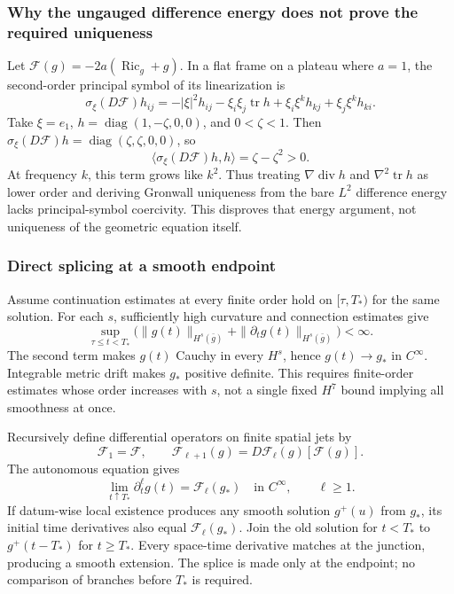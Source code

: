 \documentclass[a4paper,11pt]{article}
\numberwithin{equation}{section}
\theoremstyle{definition}
\newcommand{\Ric}{\operatorname{Ric}}
\newcommand{\tr}{\operatorname{tr}}
\begin{document}
\subsubsection{Why the ungauged difference energy does not prove the required uniqueness}\label{sec:ungauged-restart}
Let $\mathcal F(g)=-2a(\Ric_g+g)$. In a flat frame on a plateau where $a=1$,
the second-order principal symbol of its linearization is
\[
\sigma_\xi(D\mathcal F)h_{ij}
=-|\xi|^2h_{ij}-\xi_i\xi_j\tr h
 +\xi_i\xi^kh_{kj}+\xi_j\xi^kh_{ki}.
\]
Take $\xi=e_1$, $h=\operatorname{diag}(1,-\zeta,0,0)$, and $0<\zeta<1$.
Then $\sigma_\xi(D\mathcal F)h=\operatorname{diag}(\zeta,\zeta,0,0)$, so
\[
\langle\sigma_\xi(D\mathcal F)h,h\rangle=\zeta-\zeta^2>0.
\]
At frequency $k$, this term grows like $k^2$.
Thus treating $\nabla\operatorname{div}h$ and $\nabla^2\tr h$ as lower order
and deriving Gronwall uniqueness from the bare $L^2$ difference energy lacks principal-symbol coercivity.
This disproves that energy argument, not uniqueness of the geometric equation itself.

\subsubsection{Direct splicing at a smooth endpoint}\label{sec:smooth-terminal-splice}
Assume continuation estimates at every finite order hold on $[\tau,T_*)$ for the same solution.
For each $s$, sufficiently high curvature and connection estimates give
\[
\sup_{\tau\le t<T_*}
\bigl(\|g(t)\|_{H^s(\bar g)}+\|\partial_tg(t)\|_{H^s(\bar g)}\bigr)<\infty.
\]
The second term makes $g(t)$ Cauchy in every $H^s$, hence $g(t)\to g_*$ in $C^\infty$.
Integrable metric drift makes $g_*$ positive definite. This requires finite-order estimates whose order increases with $s$,
not a single fixed $H^7$ bound implying all smoothness at once.

Recursively define differential operators on finite spatial jets by
\[
\mathcal F_1=\mathcal F,\qquad
\mathcal F_{\ell+1}(g)=D\mathcal F_\ell(g)[\mathcal F(g)].
\]
The autonomous equation gives
\begin{equation}\label{eq:time-jet-splice}
\lim_{t\uparrow T_*}\partial_t^\ell g(t)=\mathcal F_\ell(g_*)
\quad\text{in }C^\infty,\qquad \ell\ge1.
\end{equation}
If datum-wise local existence produces any smooth solution $g^+(u)$ from $g_*$, its initial time derivatives also equal
$\mathcal F_\ell(g_*)$. Join the old solution for $t<T_*$ to
$g^+(t-T_*)$ for $t\ge T_*$. Every space-time derivative matches at the junction, producing a smooth extension.
The splice is made only at the endpoint; no comparison of branches before $T_*$ is required.
\end{document}
